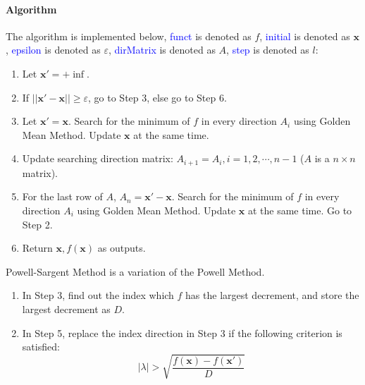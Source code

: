 \documentclass{article}
\begin{document}
\paragraph{Algorithm}
The algorithm is implemented below, \textcolor{blue}{funct} is denoted as $f$, \textcolor{blue}{initial} is denoted as $\mathbf{x}$, \textcolor{blue}{epsilon} is denoted as $\varepsilon$, \textcolor{blue}{dirMatrix} is denoted as $A$, \textcolor{blue}{step} is denoted as $l$:
\begin{enumerate}
    \item Let $\mathbf{x'} = +\inf$.
    \item If $||\mathbf{x'} - \mathbf{x}|| \geqslant \varepsilon$, go to Step 3, else go to Step 6.
    \item Let $\mathbf{x'} = \mathbf{x}$. Search for the minimum of $f$ in every direction $A_i$ using Golden Mean Method. Update $\mathbf{x}$ at the same time.
    \item Update searching direction matrix: $A_{i + 1} = A_i, i = 1, 2, \cdots, n - 1$ ($A$ is a $n \times n$ matrix).
    \item For the last row of $A$, $A_n = \mathbf{x'} - \mathbf{x}$. Search for the minimum of $f$ in every direction $A_i$ using Golden Mean Method. Update $\mathbf{x}$ at the same time. Go to Step 2.
    \item Return $\mathbf{x}, f(\mathbf{x})$ as outputs.
\end{enumerate}

Powell-Sargent Method is a variation of the Powell Method. 
\begin{enumerate}
    \item In Step 3, find out the index which $f$ has the largest decrement, and store the largest decrement as $D$.
    \item In Step 5, replace the index direction in Step 3 if the following criterion is satisfied:
    \begin{equation*}
        |\lambda| > \sqrt{\frac{f(\mathbf{x}) - f(\mathbf{x'})}{D}}
    \end{equation*}
\end{enumerate}
\end{document}
